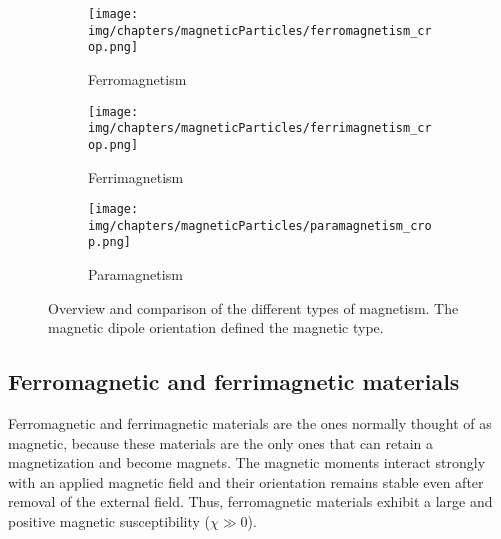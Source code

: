 \begin{figure}[htb]
        \centering
        \begin{subfigure}[b]{0.28\textwidth}
        \centering
                \texttt{[image: img/chapters/magneticParticles/ferromagnetism\_crop.png]}
                \caption{Ferromagnetism}
                \label{fig:ferromagnetism}
        \end{subfigure}
        \begin{subfigure}[b]{0.28\textwidth}
        \centering
                \texttt{[image: img/chapters/magneticParticles/ferrimagnetism\_crop.png]}
                \caption{Ferrimagnetism}
                \label{fig:ferrimagnetism}
        \end{subfigure}
        \begin{subfigure}[b]{0.28\textwidth}
        \centering
		        \texttt{[image: img/chapters/magneticParticles/paramagnetism\_crop.png]}			
                \caption{Paramagnetism}
                \label{fig:paramagnetism}
        \end{subfigure}
        \caption[Overview and comparison of the magnetic of the different types of magnetism]{Overview and comparison of the different types of magnetism. The magnetic dipole orientation defined the magnetic type.}
        \label{fig:magneticMaterialProperty}
\end{figure}

\subsection{Ferromagnetic and ferrimagnetic materials}\label{subsec:ferromagneticAndFerrimagneticMaterials}
Ferromagnetic and ferrimagnetic materials are the ones normally thought of as magnetic, because these materials are the only ones that can retain a magnetization and become magnets. The magnetic moments interact strongly with an applied magnetic field and their orientation remains stable even after removal of the external field. Thus, ferromagnetic materials exhibit a large and positive magnetic susceptibility ($\chi \gg 0$).


